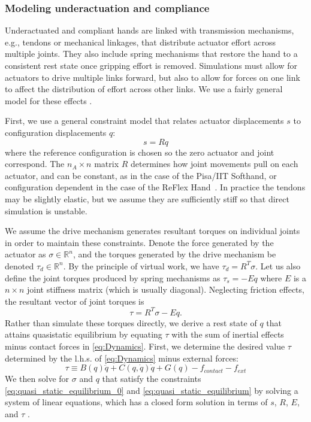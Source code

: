 \subsubsection{Modeling underactuation and compliance}

Underactuated and compliant hands are linked with transmission mechanisms, e.g., tendons or mechanical linkages, that distribute actuator effort across multiple joints. They also include spring mechanisms that restore the hand to a consistent rest state once gripping effort is removed.  Simulations must allow for actuators to drive multiple links forward, but also to allow for forces on one link to affect the distribution of effort across other links. We use a fairly general model for these effects \cite{Grioli12}.

First, we use a general constraint model that relates actuator displacements $s$ to configuration displacements $q$:
\begin{equation}
\label{eq:quasi_static_equilibrium_0}
s = R q
\end{equation}
where the reference configuration is chosen so the zero actuator and joint correspond. The $n_A \times n$ matrix $R$ determines how joint movements pull on each actuator, and can be constant, as in the case of the Pisa/IIT Softhand, or configuration dependent in the case of the ReFlex Hand~\cite{Birglen11}.  In practice the tendons may be slightly elastic, but we assume they are sufficiently stiff so that direct simulation is unstable. 

We assume the drive mechanism generates resultant torques on individual joints in order to maintain these constraints.  Denote the force generated by the actuator as $\sigma \in \mathbb{R}^n$, and the torques generated by the drive mechanism be denoted $\tau_{d} \in \mathbb{R}^n$. By the principle of virtual work, we have $\tau_{d} = R^T \sigma$.  Let us also define the joint torques produced by spring mechanisms as $\tau_{s} = - E q$ where $E$ is a $n \times n$ joint stiffness matrix (which is usually diagonal).  Neglecting friction effects, the resultant vector of joint torques is
\begin{equation}
\label{eq:quasi_static_equilibrium}
\tau = R^T\sigma - E q.
\end{equation}
Rather than simulate these torques directly, we derive a rest state of $q$ that attains quasistatic equilibrium by equating $\tau$ with the sum of inertial effects minus contact forces in \eqref{eq:Dynamics}. First, we determine the desired value $\tau$ determined by the l.h.s. of \eqref{eq:Dynamics} minus external forces:
\begin{equation}
\tau \equiv B(q)\ddot{q} + C(q,\dot{q})\dot{q} + G(q) - f_{contact} - f_{ext}
\end{equation}
We then solve for $\sigma$ and $q$ that satisfy the constraints \eqref{eq:quasi_static_equilibrium_0} and \eqref{eq:quasi_static_equilibrium} by solving a system of linear equations, which has a closed form solution in terms of $s$, $R$, $E$, and $\tau$ \cite{Grioli12}.

